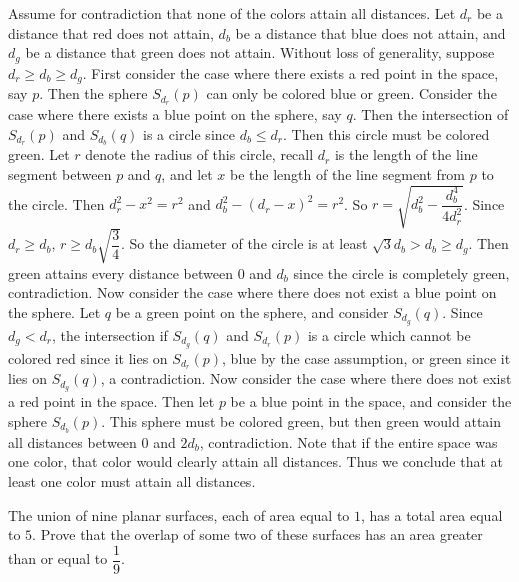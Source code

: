 \begin{solution}
    Assume for contradiction that none of the colors attain all distances. Let
    $d_r$ be a distance that red does not attain, $d_b$ be a distance that blue does not attain,
    and $d_g$ be a distance that green does not attain. Without loss of generality, suppose
    $d_r \geq d_b \geq d_g$. First consider the case where there exists a red point in the space, say
    $p$. Then the sphere $S_{d_r}(p)$ can only be colored blue or green. Consider the case
    where there exists a blue point on the sphere, say $q$. Then the intersection of $S_{d_r}(p)$ and
    $S_{d_b}(q)$ is a circle since $d_b \leq d_r$. Then this circle must be colored green. Let $r$ denote the radius
    of this circle, recall $d_r$ is the length of the line segment between $p$ and $q$, and let $x$ be the length of the
    line segment from $p$ to the circle. Then $d_r^2 - x^2 = r^2$ and $d_b^2 - (d_r - x)^2 = r^2$. So
    $r = \sqrt{d_{b}^{2}-\dfrac{d_{b}^{4}}{4d_{r}^{2}}}$. Since $d_r \geq d_b$, $r \geq d_b\sqrt{\dfrac{3}{4}}$.
    So the diameter of the circle is at least $\sqrt{3}d_b > d_b \geq d_g$. Then green attains every distance
    between $0$ and $d_b$ since the circle is completely green, contradiction. Now consider the case where there does not exist a blue point on the sphere.
    Let $q$ be a green point on the sphere, and consider $S_{d_g}(q)$. Since $d_g < d_r$, the intersection if 
    $S_{d_g}(q)$ and $S_{d_r}(p)$ is a circle which cannot be colored red since it lies on
    $S_{d_r}(p)$, blue by the case assumption, or green since it lies on $S_{d_g}(q)$, a contradiction.
    Now consider the case where there does not exist a red point in the space. Then let $p$ be a blue 
    point in the space, and consider the sphere $S_{d_b}(p)$. This sphere must be colored green, but then green would
    attain all distances between $0$ and $2d_b$, contradiction. Note that if the entire space was one color, that color would clearly
    attain all distances. Thus we conclude that at least one color must attain all distances.
\end{solution}

\begin{problem}
    The union of nine planar surfaces, each of area equal to $1$, has a total area equal to
    $5$. Prove that the overlap of some two of these surfaces has an area greater than or equal to
    $\dfrac{1}{9}$.
\end{problem}

